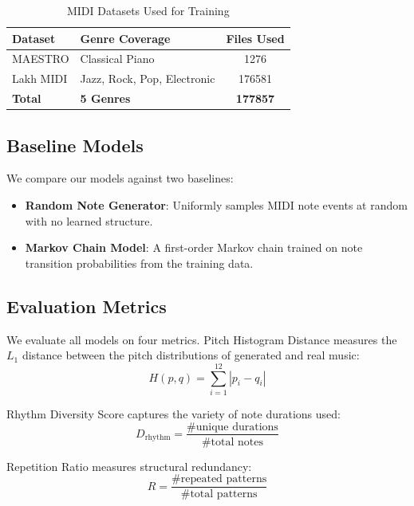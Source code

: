 \documentclass[conference]{IEEEtran}
\begin{document}
\begin{table}[htbp]
\caption{MIDI Datasets Used for Training}
\begin{center}
\begin{tabular}{|l|l|c|}
\hline
\textbf{Dataset} & \textbf{Genre Coverage} & \textbf{Files Used} \\
\hline
MAESTRO   & Classical Piano              & 1276 \\
Lakh MIDI & Jazz, Rock, Pop, Electronic  & 176581 \\
\hline
\textbf{Total} & \textbf{5 Genres} & \textbf{177857} \\
\hline
\end{tabular}
\label{tab:datasets}
\end{center}
\end{table}

\subsection{Baseline Models}

We compare our models against two baselines:
\begin{itemize}
    \item \textbf{Random Note Generator}: Uniformly samples MIDI note events
    at random with no learned structure.
    \item \textbf{Markov Chain Model}: A first-order Markov chain trained on
    note transition probabilities from the training data.
\end{itemize}

\subsection{Evaluation Metrics}

We evaluate all models on four metrics. Pitch Histogram Distance measures
the $L_1$ distance between the pitch distributions of generated and real music:
\begin{equation}
H(p, q) = \sum_{i=1}^{12} |p_i - q_i|
\end{equation}

Rhythm Diversity Score captures the variety of note durations used:
\begin{equation}
D_{\text{rhythm}} = \frac{\text{\# unique durations}}{\text{\# total notes}}
\end{equation}

Repetition Ratio measures structural redundancy:
\begin{equation}
R = \frac{\text{\# repeated patterns}}{\text{\# total patterns}}
\end{equation}
\end{document}
